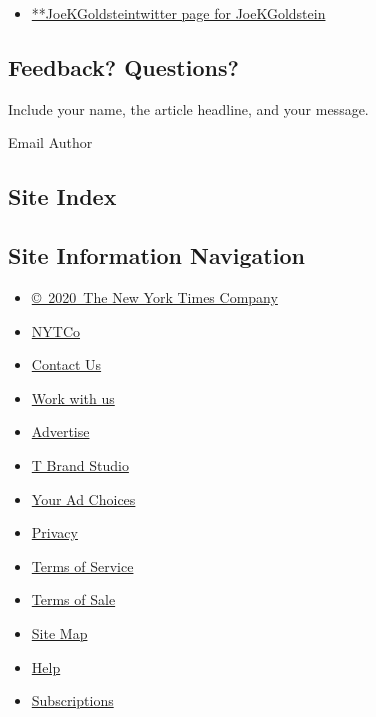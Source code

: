 \begin{itemize}
\tightlist
\item
  \href{https://twitter.com/JoeKGoldstein}{**JoeKGoldsteintwitter page
  for JoeKGoldstein}
\end{itemize}

\hypertarget{feedback-questions}{%
\subsection{Feedback? Questions?}\label{feedback-questions}}

Include your name, the article headline, and your message.

Email Author

\hypertarget{site-index}{%
\subsection{Site Index}\label{site-index}}

\hypertarget{site-information-navigation}{%
\subsection{Site Information
Navigation}\label{site-information-navigation}}

\begin{itemize}
\tightlist
\item
  \href{https://help.nytimes3xbfgragh.onion/hc/en-us/articles/115014792127-Copyright-notice}{©~2020~The
  New York Times Company}
\end{itemize}

\begin{itemize}
\tightlist
\item
  \href{https://www.nytco.com/}{NYTCo}
\item
  \href{https://help.nytimes3xbfgragh.onion/hc/en-us/articles/115015385887-Contact-Us}{Contact
  Us}
\item
  \href{https://www.nytco.com/careers/}{Work with us}
\item
  \href{https://nytmediakit.com/}{Advertise}
\item
  \href{http://www.tbrandstudio.com/}{T Brand Studio}
\item
  \href{https://www.nytimes3xbfgragh.onion/privacy/cookie-policy\#how-do-i-manage-trackers}{Your
  Ad Choices}
\item
  \href{https://www.nytimes3xbfgragh.onion/privacy}{Privacy}
\item
  \href{https://help.nytimes3xbfgragh.onion/hc/en-us/articles/115014893428-Terms-of-service}{Terms
  of Service}
\item
  \href{https://help.nytimes3xbfgragh.onion/hc/en-us/articles/115014893968-Terms-of-sale}{Terms
  of Sale}
\item
  \href{https://spiderbites.nytimes3xbfgragh.onion}{Site Map}
\item
  \href{https://help.nytimes3xbfgragh.onion/hc/en-us}{Help}
\item
  \href{https://www.nytimes3xbfgragh.onion/subscription?campaignId=37WXW}{Subscriptions}
\end{itemize}

